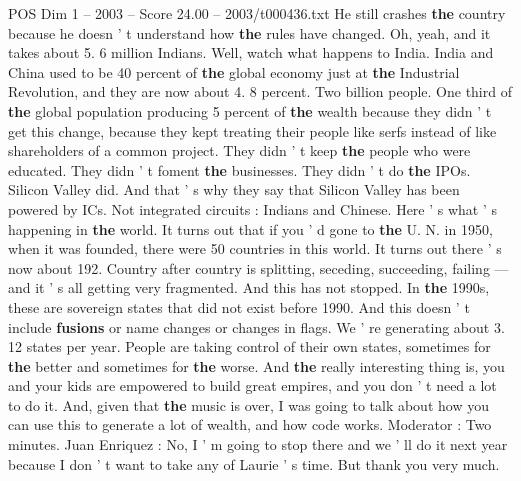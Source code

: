 \begin{textsample}{POS Dim 1 – 2003 – Score 24.00 – 2003/t000436.txt}
He still crashes \textbf{the} country because he doesn ' t understand how \textbf{the} rules have changed.
Oh, yeah, and it takes about 5. 6 million Indians.
Well, watch what happens to India.
India and China used to be 40 percent of \textbf{the} global economy just at \textbf{the} Industrial Revolution, and they are now about 4. 8 percent.
Two billion people.
One third of \textbf{the} global population producing 5 percent of \textbf{the} wealth because they didn ' t get this change, because they kept treating their people like serfs instead of like shareholders of a common project.
They didn ' t keep \textbf{the} people who were educated.
They didn ' t foment \textbf{the} businesses.
They didn ' t do \textbf{the} IPOs.
Silicon Valley did.
And that ' s why they say that Silicon Valley has been powered by ICs.
Not integrated circuits : Indians and Chinese.
Here ' s what ' s happening in \textbf{the} world.
It turns out that if you ' d gone to \textbf{the} U.
N. in 1950, when it was founded, there were 50 countries in this world.
It turns out there ' s now about 192.
Country after country is splitting, seceding, succeeding, failing — and it ' s all getting very fragmented.
And this has not stopped.
In \textbf{the} 1990s, these are sovereign states that did not exist before 1990.
And this doesn ' t include \textbf{fusions} or name changes or changes in flags.
We ' re generating about 3. 12 states per year.
People are taking control of their own states, sometimes for \textbf{the} better and sometimes for \textbf{the} worse.
And \textbf{the} really interesting thing is, you and your kids are empowered to build great empires, and you don ' t need a lot to do it.
And, given that \textbf{the} music is over, I was going to talk about how you can use this to generate a lot of wealth, and how code works.
Moderator : Two minutes.
Juan Enriquez : No, I ' m going to stop there and we ' ll do it next year because I don ' t want to take any of Laurie ' s time.
But thank you very much.

\end{textsample}
